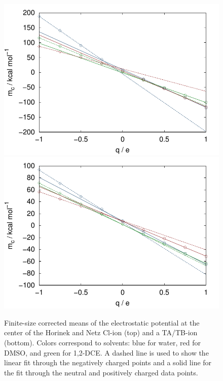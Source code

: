 \begin{tatb}
\begin{figure}
 \begin{center}
  \includegraphics[width=0.80\linewidth]{images/tatb/cl_sized_fq_means.pdf} \\
  \includegraphics[width=0.80\linewidth]{images/tatb/tatb_sized_fq_means.pdf}
  \caption[Corrected mean of the electrostatic at the center of an uncharged cavity]{\label{fig:fq_means}Finite-size corrected means of the electrostatic
  potential at the center of the Horinek and Netz Cl\sur{-}-ion (top) and a TA\sur{+}/TB\sur{-}-ion (bottom). Colors correspond to solvents: blue for water, red for
  DMSO, and green for 1,2-DCE. A dashed line is used to show the linear fit through the negatively charged points and a solid line for the fit through the neutral and
  positively charged data points.}
 \end{center}
\end{figure}


\end{tatb}
